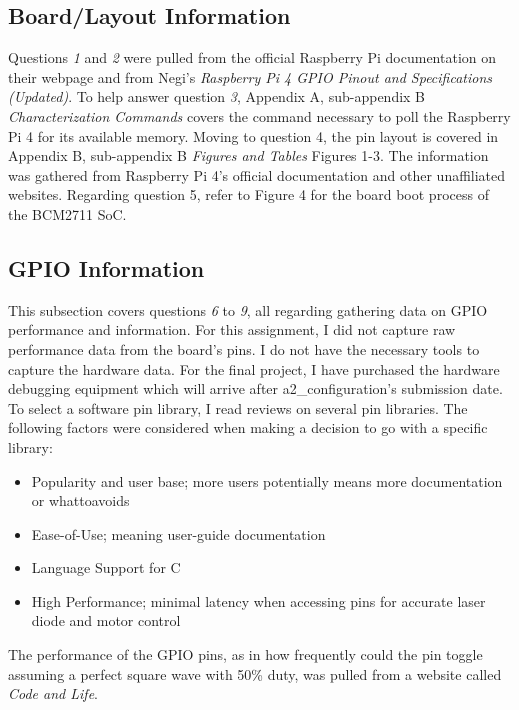 \documentclass[journal]{IEEEtran}
\begin{document}
    \subsection{Board/Layout Information}
    Questions \emph{1} and \emph{2} were pulled from the official Raspberry Pi documentation on their webpage and from Negi's \emph{Raspberry Pi 4 GPIO Pinout and Specifications (Updated)}.
    To help answer question \emph{3}, Appendix A, sub-appendix B \emph{Characterization Commands} covers the command necessary to poll the Raspberry Pi 4 for its available memory.
    Moving to question 4, the pin layout is covered in Appendix B, sub-appendix B \emph{Figures and Tables} Figures 1-3. 
    The information was gathered from Raspberry Pi 4's official documentation and other unaffiliated websites.
    Regarding question 5, refer to Figure 4 for the board boot process of the BCM2711 SoC.

    \subsection{GPIO Information}
    This subsection covers questions \emph{6} to \emph{9}, all regarding gathering data on GPIO performance and information.
    For this assignment, I did not capture raw performance data from the board's pins.
    I do not have the necessary tools to capture the hardware data. For the final project, I have purchased the hardware debugging equipment which will arrive after a2\_configuration's submission date.
    To select a software pin library, I read reviews on several pin libraries.
    The following factors were considered when making a decision to go with a specific library:
    
    \begin{itemize}
      \item Popularity and user base; more users potentially means more documentation or what\-to\-avoids
      \item Ease-of-Use; meaning user-guide documentation
      \item Language Support for C
      \item High Performance; minimal latency when accessing pins for accurate laser diode and motor control
    \end{itemize}

    The performance of the GPIO pins, as in how frequently could the pin toggle assuming a perfect square wave with 50\% duty, was pulled from a website called \emph{Code and Life}.
\end{document}
